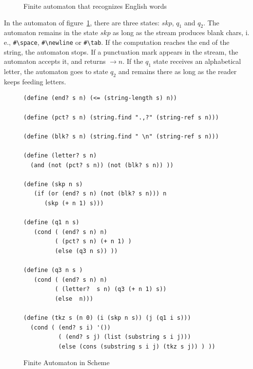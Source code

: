 \documentclass[a4paper,12pt]{book}
\newenvironment{fmpage}[1]
           {\begin{lrbox}{\fmbox}\begin{minipage}{#1}}
           {\end{minipage}\end{lrbox}\fbox{\usebox{\fmbox}}}
\begin{document}
\begin{figure}[!h]
\renewcommand\figurename{Fig.}
\caption{Finite automaton that recognizes English words}
\label{fig:automaton}
\end{figure}

In the automaton of figure~\ref{fig:automaton}, there
are three states: $skp$, $q_1$ and $q_2$.
The automaton remains in the state $skp$ as long as
the stream produces blank chars, i. e., \verb|#\space|,
\verb|#\newline| or \verb|#\tab|. If the computation
reaches the end of the string, the automaton  stops.
If a punctuation mark appears
in the stream, the automaton accepts it, and 
returns $\rightarrow n$. If the  $q_1$ state
receives an alphabetical letter, the automaton
goes to state $q_2$ and remains there 
as long as the reader keeps feeding letters.

\begin{figure}[!h]
\begin{fmpage}{0.9\linewidth}
\begin{verbatim}
(define (end? s n) (<= (string-length s) n))

(define (pct? s n) (string.find ".,?" (string-ref s n)))

(define (blk? s n) (string.find " \n" (string-ref s n)))

(define (letter? s n)
  (and (not (pct? s n)) (not (blk? s n)) ))

(define (skp n s)
   (if (or (end? s n) (not (blk? s n))) n
      (skp (+ n 1) s)))

(define (q1 n s)
   (cond ( (end? s n) n)
         ( (pct? s n) (+ n 1) )
         (else (q3 n s)) ))

(define (q3 n s )
   (cond ( (end? s n) n)
         ( (letter?  s n) (q3 (+ n 1) s))
         (else  n)))

(define (tkz s (n 0) (i (skp n s)) (j (q1 i s)))
  (cond ( (end? s i) '())
          ( (end? s j) (list (substring s i j)))
          (else (cons (substring s i j) (tkz s j)) ) ))
\end{verbatim}
\end{fmpage}
\caption{Finite Automaton in Scheme}
\label{FA-in-Scheme}
\end{figure}
\end{document}
